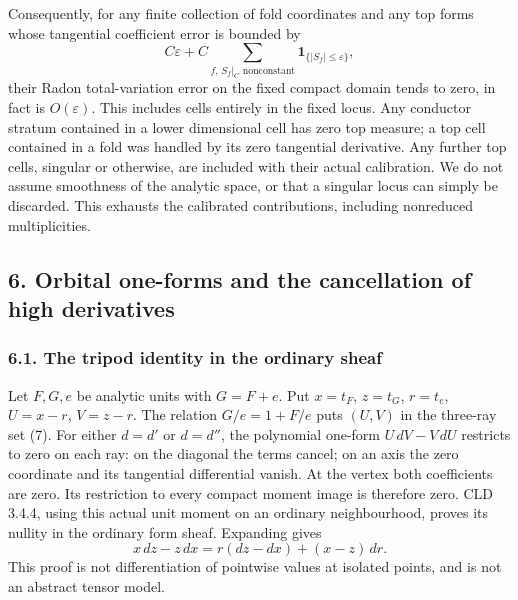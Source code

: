 \documentclass[
  11pt,
]{article}
\begin{document}
Consequently, for any finite collection of fold coordinates and any top
forms whose tangential coefficient error is bounded by \[
 C\varepsilon+C\sum_{f,\,S_f|_C\text{ nonconstant}}
       \mathbf1_{\{|S_f|\leq\varepsilon\}},                 \tag{15}
\] their Radon total-variation error on the fixed compact domain tends
to zero, in fact is \(O(\varepsilon)\). This includes cells entirely in
the fixed locus. Any conductor stratum contained in a lower dimensional
cell has zero top measure; a top cell contained in a fold was handled by
its zero tangential derivative. Any further top cells, singular or
otherwise, are included with their actual calibration. We do not assume
smoothness of the analytic space, or that a singular locus can simply be
discarded. This exhausts the calibrated contributions, including
nonreduced multiplicities.

\subsection{6. Orbital one-forms and the cancellation of high
derivatives}\label{orbital-one-forms-and-the-cancellation-of-high-derivatives}

\subsubsection{6.1. The tripod identity in the ordinary
sheaf}\label{the-tripod-identity-in-the-ordinary-sheaf}

Let \(F,G,e\) be analytic units with \(G=F+e\). Put \(x=t_F\), \(z=t_G\),
\(r=t_e\), \(U=x-r\), \(V=z-r\). The relation \(G/e=1+F/e\) puts
\((U,V)\) in the three-ray set (7). For either \(d=d'\) or \(d=d''\),
the polynomial one-form \(U\,dV-V\,dU\) restricts to zero on each ray:
on the diagonal the terms cancel; on an axis the zero coordinate and its
tangential differential vanish. At the vertex both coefficients are
zero. Its restriction to every compact moment image is therefore zero.
CLD 3.4.4, using this actual unit moment on an ordinary neighbourhood,
proves its nullity in the ordinary form sheaf. Expanding gives \[
 x\,dz-z\,dx=r(dz-dx)+(x-z)\,dr.                           \tag{16}
\] This proof is not differentiation of pointwise values at isolated
points, and is not an abstract tensor model.
\end{document}
